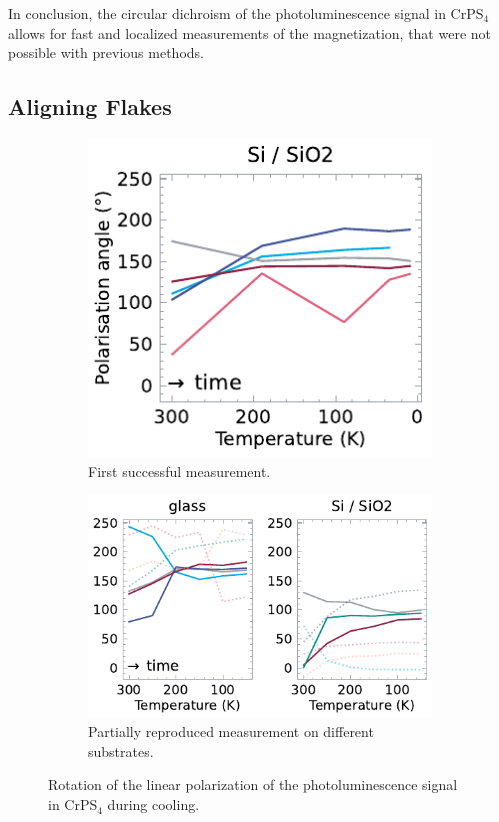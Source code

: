 \documentclass[
	oneside,
	parskip=half,
	a4paper,
]{scrbook}
\begin{document}
In conclusion, the circular dichroism of the photoluminescence signal in CrPS$_4$ allows for fast and localized measurements of the magnetization, that were not possible with previous methods.


\clearpage
\subsection{Aligning Flakes}
\label{sec:aligning flakes}
\begin{figure}
	\begin{subfigure}{2.5in}
		\includegraphics{../figures/2024-01-23 rotating pl.pdf}
		\caption{First successful measurement.}
		\label{fig:alignment first}
	\end{subfigure}
	\begin{subfigure}{3.5in}
		\includegraphics{../figures/2024-01-29 rotating pl.pdf}
		\caption{Partially reproduced measurement on different substrates.}
		\label{fig:alignment second}
	\end{subfigure}
	\caption{Rotation of the linear polarization of the photoluminescence signal in CrPS$_4$ during cooling.}
	\label{fig:alignment}
\end{figure}
\end{document}
